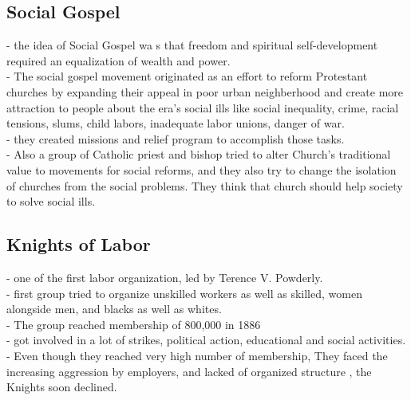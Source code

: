 \documentclass{article}
\begin{document}
\subsection{ Social Gospel}
- the idea of Social Gospel wa s that freedom and spiritual self-development required an equalization of wealth and power.\\
- The social gospel movement originated as an effort to reform Protestant churches by expanding their appeal in poor urban neighberhood and create more attraction to people about the era's social ills like social inequality, crime, racial tensions, slums, child labors, inadequate labor unions, danger of war.\\
- they created missions and relief program to accomplish those tasks.\\
- Also a group of Catholic priest and bishop tried to alter Church's traditional value to movements for social reforms, and they also try to change the isolation of churches from the social problems. They think that church should help society to solve social ills.
\subsection{ Knights of Labor}
- one of the first labor organization, led by Terence V. Powderly.\\
- first group tried to organize unskilled workers as well as skilled, women alongside men, and blacks as well as whites.\\
- The group reached membership of 800,000 in 1886 \\
- got involved in a lot of strikes, political action, educational and social activities.\\
- Even though they reached very high number of membership, They faced the increasing aggression by employers, and lacked of organized structure , the Knights soon declined.\\
\end{document}

